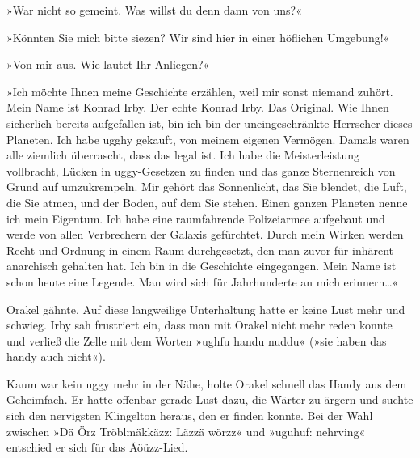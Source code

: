 »War nicht so gemeint. Was willst du denn dann von uns?«

»Könnten Sie mich bitte siezen? Wir sind hier in einer höflichen Umgebung!«

»Von mir aus. Wie lautet Ihr Anliegen?«

»Ich möchte Ihnen meine Geschichte erzählen, weil mir sonst niemand zuhört. Mein Name ist Konrad Irby. Der echte Konrad Irby. Das Original. Wie Ihnen sicherlich bereits aufgefallen ist, bin ich bin der uneingeschränkte Herrscher dieses Planeten. Ich habe ugghy gekauft, von meinem eigenen Vermögen. Damals waren alle ziemlich überrascht, dass das legal ist. Ich habe die Meisterleistung vollbracht, Lücken in uggy-Gesetzen zu finden und das ganze Sternenreich von Grund auf umzukrempeln. Mir gehört das Sonnenlicht, das Sie blendet, die Luft, die Sie atmen, und der Boden, auf dem Sie stehen. Einen ganzen Planeten nenne ich mein Eigentum. Ich habe eine raumfahrende Polizeiarmee aufgebaut und werde von allen Verbrechern der Galaxis gefürchtet. Durch mein Wirken werden Recht und Ordnung in einem Raum durchgesetzt, den man zuvor für inhärent anarchisch gehalten hat. Ich bin in die Geschichte eingegangen. Mein Name ist schon heute eine Legende. Man wird sich für Jahrhunderte an mich erinnern…«

Orakel gähnte. Auf diese langweilige Unterhaltung hatte er keine Lust mehr und schwieg. Irby sah frustriert ein, dass man mit Orakel nicht mehr reden konnte und verließ die Zelle mit dem Worten »ughfu handu nuddu« (»sie haben das handy auch nicht«).

Kaum war kein uggy mehr in der Nähe, holte Orakel schnell das Handy aus dem Geheimfach. Er hatte offenbar gerade Lust dazu, die Wärter zu ärgern und suchte sich den nervigsten Klingelton heraus, den er finden konnte. Bei der Wahl zwischen »Dä Örz Tröblmäkkäzz: Läzzä wörzz« und »uguhuf: nehrving« entschied er sich für das Äöüzz-Lied.








